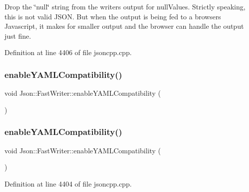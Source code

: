 Drop the \char`\"{}null\char`\"{} string from the writer\textquotesingle{}s output for null\+Values. Strictly speaking, this is not valid J\+S\+ON. But when the output is being fed to a browser\textquotesingle{}s Javascript, it makes for smaller output and the browser can handle the output just fine. 



Definition at line 4406 of file jsoncpp.\+cpp.

\hypertarget{class_json_1_1_fast_writer_a78d98e9f76d33660ad6e6a1abe287d45}{}\label{class_json_1_1_fast_writer_a78d98e9f76d33660ad6e6a1abe287d45} 
\subsubsection{\texorpdfstring{enable\+Y\+A\+M\+L\+Compatibility()}{enableYAMLCompatibility()}\hspace{0.1cm}{\footnotesize\ttfamily [1/2]}}
{\footnotesize\ttfamily void Json\+::\+Fast\+Writer\+::enable\+Y\+A\+M\+L\+Compatibility (\begin{DoxyParamCaption}{ }\end{DoxyParamCaption})}

\hypertarget{class_json_1_1_fast_writer_a78d98e9f76d33660ad6e6a1abe287d45}{}\label{class_json_1_1_fast_writer_a78d98e9f76d33660ad6e6a1abe287d45} 
\subsubsection{\texorpdfstring{enable\+Y\+A\+M\+L\+Compatibility()}{enableYAMLCompatibility()}\hspace{0.1cm}{\footnotesize\ttfamily [2/2]}}
{\footnotesize\ttfamily void Json\+::\+Fast\+Writer\+::enable\+Y\+A\+M\+L\+Compatibility (\begin{DoxyParamCaption}{ }\end{DoxyParamCaption})}



Definition at line 4404 of file jsoncpp.\+cpp.

